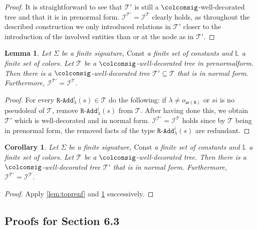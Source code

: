 \documentclass[10pt,a4paper]{amsart}
\theoremstyle{definition}
\numberwithin{equation}{section}
\theoremstyle{plain}
\newtheorem{lemma}[lemma]{Lemma}
\newtheorem{corollary}[corollary]{Corollary}
\theoremstyle{definition}
\theoremstyle{myexample}
\theoremstyle{plain}
\theoremstyle{definition}
\newcommand{\instance}{\mathcal{I}}
\newcommand{\inst}{\instance}
\newcommand{\origcol}{o}
\newcommand{\cols}{\mathbb{L}}
\newcommand{\arity}[1]{\fcn{ar}(#1)}
\newcommand{\unradd}[2]{#2\pred{\texttt{-}Add}_{#1}}
\newcommand{\fcn}[1]{\mathsf{#1}}
\newcommand{\pred}[1]{\mathtt{#1}}
\newcommand{\rpred}{\pred{R}}
\begin{document}
\begin{proof}
	It is straightforward to see that $\mathcal{T}'$ is still a $\colconsig$-well-decorated tree and that it is in prenormal form.
	$\inst^{\mathcal{T}'}=\inst^{\mathcal{T}}$ clearly holds, as throughout the described construction we only introduced relations in $\mathcal{T}'$ closer to the introduction of the involved entities than or at the node as in $\mathcal{T}'$. %
\end{proof}
\begin{lemma}\label{lem:prenftonf}
	Let $\Sigma$ be a finite signature, $\mathrm{Const}$ a finite set of constants and $\cols$ a finite set of colors. Let $\mathcal{T}$ be a $\colconsig$-well-decorated tree in prenormalform. Then there is a  $\colconsig$-well-decorated tree $\mathcal{T}'\subseteq \mathcal{T}$ that is in normal form. Furthermore, $\inst^{\mathcal{T}'} = \inst^{\mathcal{T}}$.
\end{lemma}
\begin{proof}
	For every $\unradd{\lambda}{\rpred}^{i}(s)\in\mathcal{T}$ do the following:
	if $\lambda\neq\origcol_{\arity{\rpred}}$ or $si$ is no pseudoleaf of $\mathcal{T}$, remove $\unradd{\lambda}{\rpred}^{i}(s)$ from $\mathcal{T}$. After having done this, we obtain $\mathcal{T}'$ which is well-decorated and in normal form.
	$\inst^{\mathcal{T}'} = \inst^{\mathcal{T}}$ holds since by $\mathcal{T}$ being in prenormal form, the removed facts of the type $\unradd{\lambda}{\rpred}^{i}(s)$ are redundant.
\end{proof}
\begin{corollary}\label{cor:tonf}
	Let $\Sigma$ be a finite signature, $\mathrm{Const}$ a finite set of constants and $\cols$ a finite set of colors. Let $\mathcal{T}$ be a $\colconsig$-well-decorated tree. Then there is a  $\colconsig$-well-decorated tree $\mathcal{T}'$ that is in normal form. Furthermore, $\inst^{\mathcal{T}'} = \inst^{\mathcal{T}}$.
\end{corollary}
\begin{proof}
	Apply \cref{lem:toprenf} and \cref{lem:prenftonf} successively.
\end{proof}
\vspace{-0.3ex}

\subsection{Proofs for Section 6.3}
\end{document}
